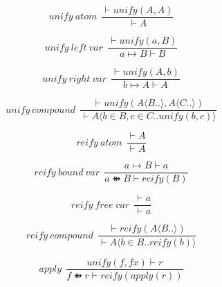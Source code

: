 $$unify \ atom \ \ \frac{⊢unify(A,A)}{⊢A}$$

$$unify \ left \ var \ \ \frac{⊢unify(a,B)}{a↦B⊢B}$$

$$unify \ right \ var \ \ \frac{⊢unify(A,b)}{b↦A⊢A}$$

$$unify \ compound \ \ \frac{⊢unify(A \langle B.. \rangle ,A \langle C.. \rangle)}{⊢A \langle b∈B,c∈C..unify(b,c) \rangle}$$

$$reify \ atom \ \ \frac{⊢A}{⊢A}$$

$$reify \ bound \ var \ \ \frac{a↦B⊢a}{a⇻B⊢reify(B)}$$

$$reify \ free \ var \ \ \frac{⊢a}{⊢a}$$

$$reify \ compound \ \ \frac{⊢reify(A \langle B.. \rangle)}{⊢A \langle b∈B..reify(b) \rangle}$$

$$apply \ \ \frac{unify(f,fx)⊢r}{f⇻r⊢reify(apply(r))}$$
